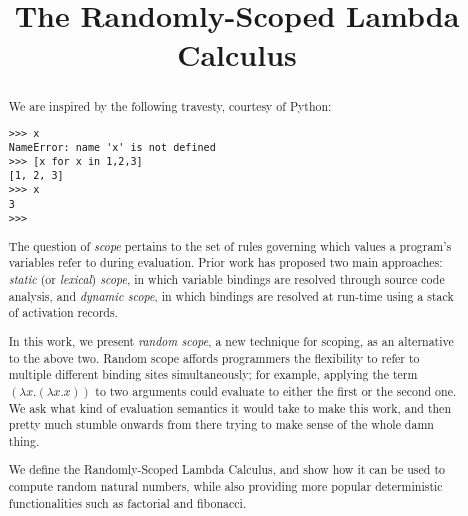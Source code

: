 \documentclass{sigplanconf}
\begin{document}
\copyrightdata{[to be supplied]} 


\title{
  The Randomly-Scoped Lambda Calculus
}



\maketitle

\begin{abstract}

We are inspired by the following travesty, courtesy of Python:
\begin{verbatim}
>>> x
NameError: name 'x' is not defined
>>> [x for x in 1,2,3]
[1, 2, 3]
>>> x
3
>>>
\end{verbatim}

The question of {\em scope} pertains to the set of rules governing which values a program's variables refer to during evaluation.
Prior work has proposed two main approaches: {\em static} (or {\em lexical}) {\em scope}, in which variable bindings are resolved through source code analysis, and {\em dynamic scope}, in which bindings are resolved at run-time using a stack of activation records.

In this work, we present {\em random scope}, a new technique for scoping, as an alternative to the above two.
Random scope affords programmers the flexibility to refer to multiple different binding sites simultaneously; for example, applying the term $(\lambda x. (\lambda x. x))$ to two arguments could evaluate to either the first or the second one.
We ask what kind of evaluation semantics it would take to make this work, and then pretty much stumble onwards from there trying to make sense of the whole damn thing.

We define the Randomly-Scoped Lambda Calculus, and show how it can be used to compute random natural numbers, while also providing more popular deterministic functionalities such as factorial and fibonacci.

\end{abstract}
\end{document}
